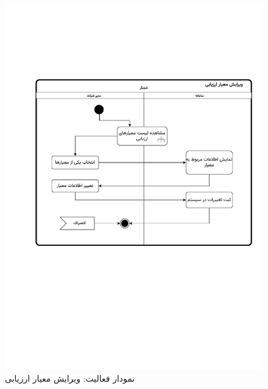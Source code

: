 \begin{figure}[ht!]
	\centering
	\includegraphics[scale=0.8, page=1]{figs/OOD-activity-editeval.pdf}
	\caption{نمودار فعالیت: ویرایش معیار ارزیابی}
\end{figure}
\FloatBarrier
\newpage

